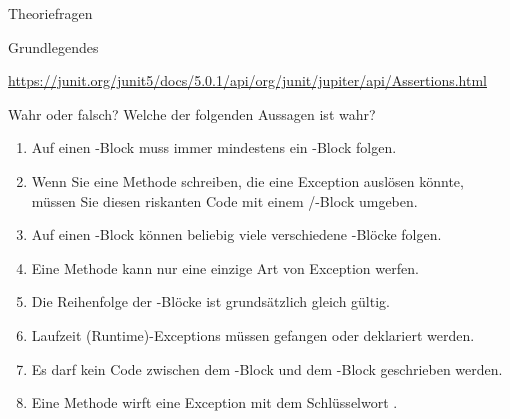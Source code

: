 \documentclass{../tuda-exercise}
\begin{document}
\begin{task}[credit=\stars{0}{3}]{Theoriefragen}
\begin{subtask*}{Grundlegendes}
\begin{solution}
\begin{note}[title=Information:]
          \begin{center}
            \url{https://junit.org/junit5/docs/5.0.1/api/org/junit/jupiter/api/Assertions.html}
          \end{center}
        \end{note}
      \end{solution}
    \end{subtask*}

    \begin{subtask*}{Wahr oder falsch?}
      Welche der folgenden Aussagen ist wahr?
      \begin{enumerate}
        [label=(\Alph*)]
        \item Auf einen -Block muss immer mindestens ein -Block
        folgen.
        \item Wenn Sie eine Methode schreiben, die eine Exception auslösen könnte, müssen Sie
        diesen riskanten Code mit einem /-Block umgeben.
        \item Auf einen -Block können beliebig viele verschiedene
        -Blöcke folgen.
        \item Eine Methode kann nur eine einzige Art von Exception werfen.
        \item Die Reihenfolge der -Blöcke ist grundsätzlich gleich gültig.
        \item Laufzeit (Runtime)-Exceptions müssen gefangen oder deklariert werden.
        \item Es darf kein Code zwischen dem -Block und dem
        -Block geschrieben werden.
        \item Eine Methode wirft eine Exception mit dem Schlüsselwort .
      \end{enumerate}


\end{subtask*}
\end{task}
\end{document}
